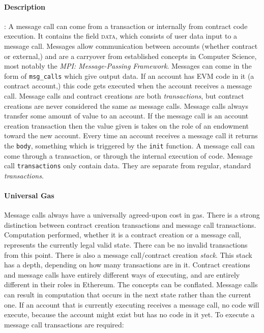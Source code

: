 \documentclass[10pt,a4paper,leqno,bibliography=totoc]{scrartcl}
\newenvironment{alphafootnotes}
{\par\edef\savedfootnotenumber{\number\value{footnote}}
\renewcommand{\thefootnote}{\alph{footnote}}
\setcounter{footnote}{0}}
{\par\setcounter{footnote}{\savedfootnotenumber}}
\begin{document}
\begin{alphafootnotes}
\begin{multicols*}{2}
\paragraph{Description}: A message call can come from a transaction or internally from contract code execution. It contains the field \textsc{data}, which consists of user data input to a message call.
 Messages allow communication between accounts (whether contract or external,) and are a carryover from established concepts in Computer Science, most notably the \textsl{MPI: Message-Passing Framework}. Messages can come in the form of \texttt{msg\_calls} which give output data. If an account has EVM code in it (a contract account,) this code gets executed when the account receives a message call. Message calls and contract creations are both \textsl{transactions}, but contract creations are never considered the same as message calls. Message calls always transfer some amount of value to an account. If the message call is an account creation transaction then the value given is takes on the role of an endowment toward the new account. Every time an account receives a message call it returns the \texttt{body}, something which is triggered by the \texttt{init} function. A message call can come through a transaction, or through the internal execution of code. Message call \texttt{transactions} only contain data. They are separate from regular, standard \textit{transactions}.

\paragraph{Universal Gas}Message calls always have a universally agreed-upon cost in gas. There is a strong distinction between contract creation transactions and message call transactions. Computation performed, whether it is a contract creation or a message call, represents the currently legal valid state. There can be no invalid transactions from this point. \supercite{Wood2017} There is also a message call/contract creation \textit{stack}. This stack has a depth, depending on how many transactions are in it. Contract creations and message calls have entirely different ways of executing, and are entirely different in their roles in Ethereum. The concepts can be conflated. Message calls can result in computation that occurs in the next state rather than the current one. If an account that is currently executing receives a message call, no code will execute, because the account might exist but has no code in it yet. To execute a message call transactions are required:


\end{multicols*}
\end{alphafootnotes}
\end{document}
